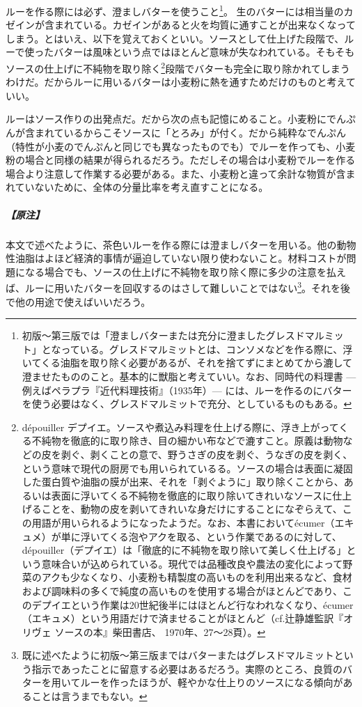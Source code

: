 \begin{recette}
ルーを作る際には必ず、澄ましバターを使うこと\footnote{初版〜第三版では「澄ましバターまたは充分に澄ましたグレスドマルミット」となっている。グレスドマルミットとは、コンソメなどを作る際に、浮いてくる油脂を取り除く必要があるが、それを捨てずにまとめてから漉して澄ませたもののこと。基本的に獣脂と考えていい。なお、同時代の料理書
  --- 例えばペラプラ『近代料理技術』（1935年）---
  には、ルーを作るのにバターを使う必要はなく、グレスドマルミットで充分、としているものもある。}。
生のバターには相当量のカゼインが含まれている。カゼインがあると火を均質に通すことが出来なくなってしまう。とはいえ、以下を覚えておくといい。ソースとして仕上げた段階で、ルーで使ったバターは風味という点ではほとんど意味が失なわれている。そもそもソースの仕上げに不純物を取り除く\footnote{dépouiller
  デプイエ。ソースや煮込み料理を仕上げる際に、浮き上がってくる不純物を徹底的に取り除き、目の細かい布などで漉すこと。原義は動物などの皮を剥ぐ、剥くことの意で、野うさぎの皮を剥ぐ、うなぎの皮を剥く、という意味で現代の厨房でも用いられているる。ソースの場合は表面に凝固した蛋白質や油脂の膜が出来、それを「剥ぐように」取り除くことから、あるいは表面に浮いてくる不純物を徹底的に取り除いてきれいなソースに仕上げることを、動物の皮を剥いてきれいな身だけにすることになぞらえて、この用語が用いられるようになったようだ。なお、本書においてécumer（エキュメ）が単に浮いてくる泡やアクを取る、という作業であるのに対して、dépouiller（デプイエ）は「徹底的に不純物を取り除いて美しく仕上げる」という意味合いが込められている。現代では品種改良や農法の変化によって野菜のアクも少なくなり、小麦粉も精製度の高いものを利用出来るなど、食材および調味料の多くで純度の高いものを使用する場合がほとんどであり、このデプイエという作業は20世紀後半にはほとんど行なわれなくなり、écumer（エキュメ）という用語だけで済ませることがほとんど（cf.辻静雄監訳『オリヴェ
  ソースの本』柴田書店、 1970年、27〜28頁）。}段階でバターも完全に取り除かれてしまうわけだ。だからルーに用いるバターは小麦粉に熱を通すためだけのものと考えていい。

ルーはソース作りの出発点だ。だから次の点も記憶にめること。小麦粉にでんぷんが含まれているからこそソースに「とろみ」が付く。だから純粋なでんぷん（特性が小麦のでんぷんと同じでも異なったものでも）でルーを作っても、小麦粉の場合と同様の結果が得られるだろう。ただしその場合は小麦粉でルーを作る場合より注意して作業する必要がある。また、小麦粉と違って余計な物質が含まれていないために、全体の分量比率を考え直すことになる。

\hypertarget{nota-roux}{%
\subparagraph{【原注】}\label{nota-roux}}

本文で述べたように、茶色いルーを作る際には澄ましバターを用いる。他の動物性油脂はよほど経済的事情が逼迫していない限り使わないこと。材料コストが問題になる場合でも、ソースの仕上げに不純物を取り除く際に多少の注意を払えば、ルーに用いたバターを回収するのはさして難しいことではない\footnote{既に述べたように初版〜第三版まではバターまたはグレスドマルミットという指示であったことに留意する必要はあるだろう。実際のところ、良質のバターを用いてルーを作ったほうが、軽やかな仕上りのソースになる傾向があることは言うまでもない。}。それを後で他の用途で使えばいいだろう。


\end{recette}
